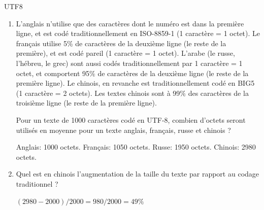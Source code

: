 \begin{exercice}
\begin{exercicelet}{UTF8}
\begin{enumerate}
\begin{xcorrection}
{          Ce code a l'avantage que l'on peut aussi trouver facilement en lisant
          une suite d'octets représentant de l'UTF-8 combien d'octets occupe
          chaque caractère codé: on les écrit en binaire, et on sait
          automatiquement avec le premier octet dans quelle ligne on se trouve, et
          donc combien d'octets sont utilisés pour le caractère. On peut alors
          sauter au caractère suivant facilement.
        }\end{xcorrection}
    \item {\small L'anglais n'utilise que des caractères dont le numéro est dans la
        première ligne, et est codé traditionnellement en ISO-8859-1 (1
        caractère = 1 octet). Le français utilise 5\% de caractères de la
        deuxième ligne (le reste de la première), et est codé pareil (1
        caractère = 1 octet). L'arabe (le russe, l'hébreu, le grec) sont aussi
        codés traditionnellement par 1 caractère = 1 octet, et comportent 95\%
        de caractères de la deuxième ligne (le reste de la première ligne). Le
        chinois, en revanche est traditionnellement codé en BIG5 (1 caractère
        = 2 octets). Les textes chinois sont à 99\% des caractères de la
        troisième ligne (le reste de la première ligne).}
      
      Pour un texte de 1000 caractères codé en UTF-8, combien d'octets
      seront utilisés en moyenne pour un texte anglais, français, russe et
      chinois ?
      \begin{correction}{ Anglais: 1000 octets. Français: 1050
          octets. Russe: 1950 octets. Chinois: 2980 octets.
        }\end{correction}
    \item Quel est en chinois l'augmentation de la taille du
      texte par rapport au codage traditionnel ?
      \begin{correction}{$(2980-2000)/2000=980/2000=49\%$}\end{correction}
    \end{enumerate}
  \end{exercicelet}
\end{exercice}
